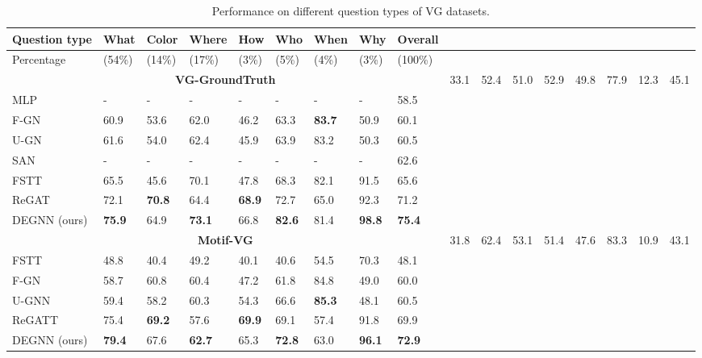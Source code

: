 \documentclass[letterpaper]{article} %
\begin{document}
\begin{table}[ht] 
\centering
    \begin{tabular}{l|lllllllll}
    \hline
    \textbf{Question type}&\textbf{What}&\textbf{Color}&\textbf{Where}&\textbf{How}&\textbf{Who}&\textbf{When}&\textbf{Why}&\textbf{Overall}\\
    \hline
     Percentage &(54\%) &(14\%) &(17\%) &(3\%) &(5\%) &(4\%) &(3\%) &(100\%)\\
    \hline
    \multicolumn{9}{c}{\bf VG-GroundTruth} \cr\hline %
     NSM~\cite{DBLP:conf/nips/HudsonM19} &33.1 &52.4 &51.0 &52.9 &49.8 &77.9 &12.3 &45.1\\
     MLP~\cite{DBLP:conf/eccv/JabriJM16} &- &- &- &- &- &- &- &58.5\\
     F-GN~\cite{DBLP:conf/bmvc/ZhangCX19}&60.9 &53.6 &62.0 &46.2 &63.3 &\textbf{83.7} &50.9 &60.1\\
     U-GN~\cite{DBLP:conf/bmvc/ZhangCX19}&61.6 &54.0 &62.4 &45.9 &63.9 & 83.2 &50.3 &60.5\\
     SAN~\cite{DBLP:conf/cvpr/YangHGDS16} &- &- &- &- &- &- &- &62.6\\
     FSTT~\cite{inproceedings} &65.5 &45.6 &70.1 &47.8 &68.3 &82.1 &91.5 &65.6\\
     ReGAT~\cite{DBLP:conf/iccv/LiGCL19} &72.1 &\textbf{70.8} &64.4 &\textbf{68.9} &72.7 &65.0 &92.3 &71.2\\
     DEGNN (ours) &\textbf{75.9} &64.9 &\textbf{73.1} &66.8 &\textbf{82.6} &81.4 &\textbf{98.8} &\textbf{75.4}\\
    \hline
     \multicolumn{9}{c}{\bf Motif-VG} \cr\hline
     NSM~\cite{DBLP:conf/nips/HudsonM19} &31.8 &62.4 &53.1 &51.4 &47.6 &83.3 &10.9 &43.1\\
     FSTT~\cite{inproceedings} &48.8 &40.4 &49.2 &40.1 &40.6 &54.5 &70.3 &48.1\\
     F-GN~\cite{DBLP:conf/bmvc/ZhangCX19} &58.7 &60.8 &60.4 &47.2 &61.8 &84.8 &49.0 &60.0\\
     U-GNN~\cite{DBLP:conf/bmvc/ZhangCX19} &59.4 &58.2 &60.3 &54.3 &66.6 &\textbf{85.3} &48.1 &60.5\\
     ReGATT~\cite{DBLP:conf/iccv/LiGCL19} &75.4 &\textbf{69.2} &57.6 &\textbf{69.9} &69.1 &57.4 &91.8 &69.9\\
     DEGNN (ours) &\textbf{79.4} &67.6 &\textbf{62.7} &65.3 &\textbf{72.8} &63.0 &\textbf{96.1} &\textbf{72.9}\\
    \hline
    \end{tabular}
\caption{\label{VG-detail}
Performance on different question types of VG datasets.}
\end{table}
\end{document}
